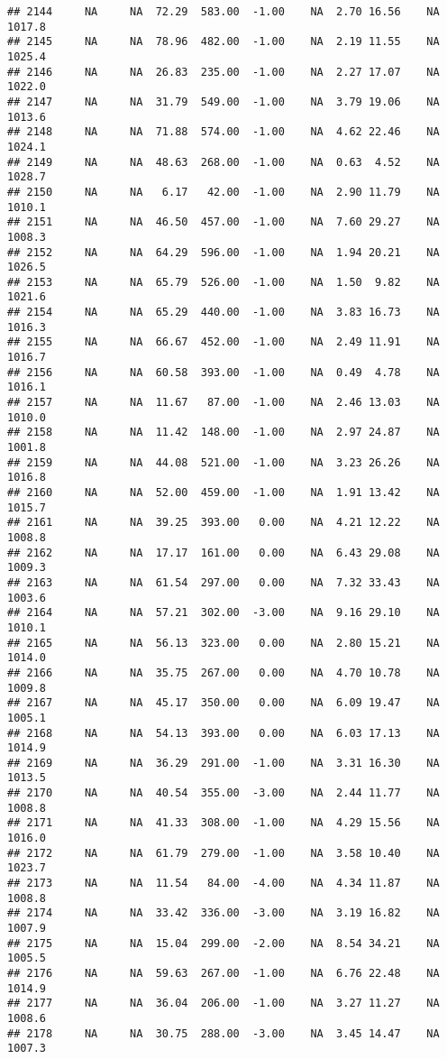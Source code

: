 \documentclass{article}\usepackage{graphicx, color}
\makeatletter
\newenvironment{kframe}{%
 \def\at@end@of@kframe{}%
 \ifinner\ifhmode%
  \def\at@end@of@kframe{\end{minipage}}%
  \begin{minipage}{\columnwidth}%
 \fi\fi%
 \def\FrameCommand##1{\hskip\@totalleftmargin \hskip-\fboxsep
 \colorbox{shadecolor}{##1}\hskip-\fboxsep
     \hskip-\linewidth \hskip-\@totalleftmargin \hskip\columnwidth}%
 \MakeFramed {\advance\hsize-\width
   \@totalleftmargin\z@ \linewidth\hsize
   \@setminipage}}%
 {\par\unskip\endMakeFramed%
 \at@end@of@kframe}
\newenvironment{knitrout}{}{} %
\makeatother
\begin{document}
\begin{knitrout}
\begin{kframe}
\begin{verbatim}
## 2144     NA     NA  72.29  583.00  -1.00    NA  2.70 16.56    NA 1017.8
## 2145     NA     NA  78.96  482.00  -1.00    NA  2.19 11.55    NA 1025.4
## 2146     NA     NA  26.83  235.00  -1.00    NA  2.27 17.07    NA 1022.0
## 2147     NA     NA  31.79  549.00  -1.00    NA  3.79 19.06    NA 1013.6
## 2148     NA     NA  71.88  574.00  -1.00    NA  4.62 22.46    NA 1024.1
## 2149     NA     NA  48.63  268.00  -1.00    NA  0.63  4.52    NA 1028.7
## 2150     NA     NA   6.17   42.00  -1.00    NA  2.90 11.79    NA 1010.1
## 2151     NA     NA  46.50  457.00  -1.00    NA  7.60 29.27    NA 1008.3
## 2152     NA     NA  64.29  596.00  -1.00    NA  1.94 20.21    NA 1026.5
## 2153     NA     NA  65.79  526.00  -1.00    NA  1.50  9.82    NA 1021.6
## 2154     NA     NA  65.29  440.00  -1.00    NA  3.83 16.73    NA 1016.3
## 2155     NA     NA  66.67  452.00  -1.00    NA  2.49 11.91    NA 1016.7
## 2156     NA     NA  60.58  393.00  -1.00    NA  0.49  4.78    NA 1016.1
## 2157     NA     NA  11.67   87.00  -1.00    NA  2.46 13.03    NA 1010.0
## 2158     NA     NA  11.42  148.00  -1.00    NA  2.97 24.87    NA 1001.8
## 2159     NA     NA  44.08  521.00  -1.00    NA  3.23 26.26    NA 1016.8
## 2160     NA     NA  52.00  459.00  -1.00    NA  1.91 13.42    NA 1015.7
## 2161     NA     NA  39.25  393.00   0.00    NA  4.21 12.22    NA 1008.8
## 2162     NA     NA  17.17  161.00   0.00    NA  6.43 29.08    NA 1009.3
## 2163     NA     NA  61.54  297.00   0.00    NA  7.32 33.43    NA 1003.6
## 2164     NA     NA  57.21  302.00  -3.00    NA  9.16 29.10    NA 1010.1
## 2165     NA     NA  56.13  323.00   0.00    NA  2.80 15.21    NA 1014.0
## 2166     NA     NA  35.75  267.00   0.00    NA  4.70 10.78    NA 1009.8
## 2167     NA     NA  45.17  350.00   0.00    NA  6.09 19.47    NA 1005.1
## 2168     NA     NA  54.13  393.00   0.00    NA  6.03 17.13    NA 1014.9
## 2169     NA     NA  36.29  291.00  -1.00    NA  3.31 16.30    NA 1013.5
## 2170     NA     NA  40.54  355.00  -3.00    NA  2.44 11.77    NA 1008.8
## 2171     NA     NA  41.33  308.00  -1.00    NA  4.29 15.56    NA 1016.0
## 2172     NA     NA  61.79  279.00  -1.00    NA  3.58 10.40    NA 1023.7
## 2173     NA     NA  11.54   84.00  -4.00    NA  4.34 11.87    NA 1008.8
## 2174     NA     NA  33.42  336.00  -3.00    NA  3.19 16.82    NA 1007.9
## 2175     NA     NA  15.04  299.00  -2.00    NA  8.54 34.21    NA 1005.5
## 2176     NA     NA  59.63  267.00  -1.00    NA  6.76 22.48    NA 1014.9
## 2177     NA     NA  36.04  206.00  -1.00    NA  3.27 11.27    NA 1008.6
## 2178     NA     NA  30.75  288.00  -3.00    NA  3.45 14.47    NA 1007.3

\end{verbatim}
\end{kframe}
\end{knitrout}
\end{document}
